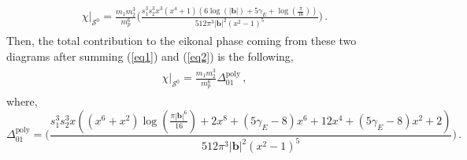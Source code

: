 \begin{align}
    \begin{split} \label{eq2}
 \chi\Big|_{\mathcal{S}^0}=\frac{m_1 m_2^3}{m_p^6}\Bigg(\frac{ s_1^3 s_2^3 x^3 \left(x^4+1\right) (6 \log (|\boldsymbol{b}|)+5 \gamma_E +\log \left(\frac{\pi }{16}\right))}{512 \pi ^3 |\boldsymbol{b}|^2 \left(x^2-1\right)^5}\Bigg)\,.
    \end{split}
\end{align}
Then, the total contribution to the eikonal phase coming from these two diagrams after summing (\ref{eq1}) and (\ref{eq2}) is the following, 
\begin{align}
    \begin{split} \label{eqt1}
 \chi\Big|_{\mathcal{S}^0}=\frac{m_1 m_2^3}{m_p^6}\Delta_{\mathfrak{01}}^{\textrm{poly}}\,,
    \end{split}
\end{align}
where, $$\Delta_{\mathfrak{01}}^{\textrm{poly}}=\Bigg(\frac{s_1^3 s_2^3 x \left(\left(x^6+x^2\right) \log \left(\frac{\pi  |\boldsymbol{b}|^6}{16}\right)+2 x^8+(5 \gamma_E -8) x^6+12 x^4+(5 \gamma_E -8) x^2+2\right)}{512 \pi ^3 |\boldsymbol{b}|^2 \left(x^2-1\right)^5}\Bigg)\,.$$


